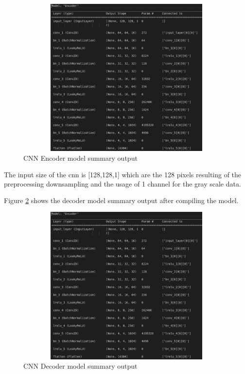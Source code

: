 \begin{figure}[ht]
    \centering
    \includegraphics[width = 14cm, height = 8cm]{images/cnn-encoder-output.png}
    \caption[CNN Encoder model summary output]{CNN Encoder model summary output}
    \label{fig:cnnencoderoutput}
\end{figure}

The input size of the \acrshort*{cnn} is [128,128,1] which are the 128 pixels resulting of the preprocessing downsampling and the usage of 1 channel for the gray scale data.

Figure \ref{fig:cnndecoderoutput} shows the decoder model summary output after compiling the model.

\begin{figure}[ht]
    \centering
    \includegraphics[width = 14cm, height = 8cm]{images/cnn-encoder-output.png}
    \caption[CNN Decoder model summary output]{CNN Decoder model summary output}
    \label{fig:cnndecoderoutput}
\end{figure}

